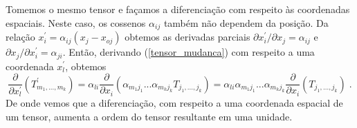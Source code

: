 Tomemos o mesmo tensor e fa\c{c}amos a diferencia\c{c}\~ao com
respeito \`as coordenadas espaciais. Neste caso, os cossenos
$\alpha_{ij}$ tamb\'em n\~ao dependem da posi\c{c}\~ao. Da
rela\c{c}\~ao $x_i^{'}=\alpha_{ij}(x_j-x_{oj})$ obtemos as
derivadas parciais $\partial x_i^{'} / \partial x_j = \alpha_{ij}$
e $\partial x_j / \partial x_i^{'} = \alpha_{ji}$. Ent\~ao,
derivando (\ref{tensor_mudanca}) com respeito a uma coordenada
$x_l^{'}$, obtemos
\begin{equation}
\frac{\partial}{\partial
x_l^{'}}(T^{'}_{m_1,...,m_k})=\alpha_{li}\frac{\partial}{\partial
x_i}(\alpha_{m_1 j_1}...\alpha_{m_k
j_k}T_{j_1,...,j_k})=\alpha_{li}\alpha_{m_1 j_1}...\alpha_{m_k
j_k} \frac{\partial}{\partial x_i}(T_{j_1,...,j_k}) \;.
\end{equation}
De onde vemos que a diferencia\c{c}\~ao, com respeito a uma
coordenada espacial de um tensor, aumenta a ordem do tensor
resultante em uma unidade.
